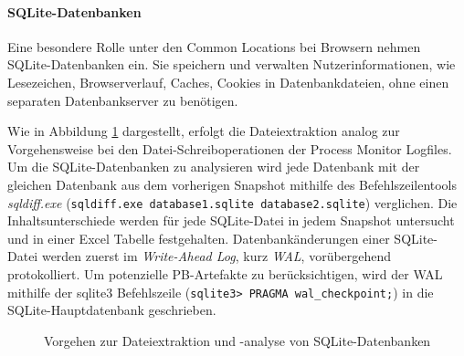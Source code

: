 \paragraph*{SQLite-Datenbanken}
\label{subsubsection:methodik-datenanalyse-commonlocations-sqlitedbs}
Eine besondere Rolle unter den Common Locations bei Browsern nehmen SQLite-Datenbanken ein. 
Sie speichern und verwalten Nutzerinformationen, wie Lesezeichen, Browserverlauf, Caches, Cookies in Datenbankdateien, ohne einen separaten Datenbankserver zu benötigen.

Wie in Abbildung \ref{img:dateiextraktion-und-analyse-sqlite} dargestellt, erfolgt die Dateiextraktion analog zur Vorgehensweise bei den Datei-Schreiboperationen der Process Monitor Logfiles. Um die SQLite-Datenbanken zu analysieren wird jede Datenbank mit der gleichen Datenbank aus dem vorherigen Snapshot mithilfe des Befehlszeilentools \textit{sqldiff.exe} (\texttt{sqldiff.exe database1.sqlite database2.sqlite}) verglichen. Die Inhaltsunterschiede werden für jede SQLite-Datei in jedem Snapshot untersucht und in einer Excel Tabelle festgehalten.
Datenbankänderungen einer SQLite-Datei werden zuerst im \textit{Write-Ahead Log}, kurz \textit{WAL}, vorübergehend protokolliert. 
Um potenzielle PB-Artefakte zu berücksichtigen, wird der WAL mithilfe der sqlite3 Befehlszeile (\texttt{sqlite3> PRAGMA wal\_checkpoint;}) in die SQLite-Hauptdatenbank geschrieben.
\begin{figure}[h!]
	\centering
	\small
	\centerline{\resizebox{\linewidth}{!}{}}
	\caption{Vorgehen zur Dateiextraktion und -analyse von SQLite-Datenbanken}
	\label{img:dateiextraktion-und-analyse-sqlite}
\end{figure}


